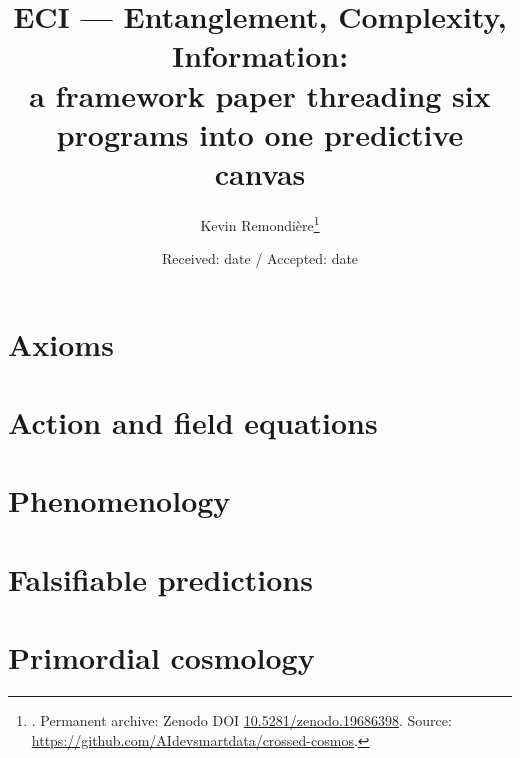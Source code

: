 \documentclass[epj,twocolumn]{svjour3}
\begin{document}
\title{ECI --- Entanglement, Complexity, Information:\\
a framework paper threading six programs into one predictive canvas}

\author{Kevin Remondi\`ere\thanks{.
Permanent archive: Zenodo DOI \href{https://doi.org/10.5281/zenodo.19686398}{10.5281/zenodo.19686398}.
Source: \url{https://github.com/AIdevsmartdata/crossed-cosmos}.}}


\date{Received: date / Accepted: date}


\maketitle

\section{Axioms}\label{sec:axioms}

\section{Action and field equations}\label{sec:action}

\section{Phenomenology}\label{sec:pheno}

\section{Falsifiable predictions}\label{sec:pred}

\section{Primordial cosmology}\label{sec:primordial}
\end{document}
